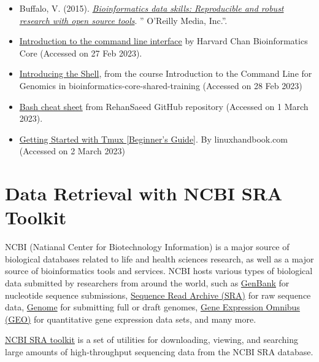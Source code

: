 \documentclass[
  letterpaper,
  DIV=11,
  numbers=noendperiod]{scrreprt}
\begin{document}
\begin{itemize}
\item
  Buffalo, V. (2015).
  \href{https://books.google.co.th/books/about/Bioinformatics_Data_Skills.html?id=XxERCgAAQBAJ}{\emph{Bioinformatics
  data skills: Reproducible and robust research with open source
  tools}}. '' O'Reilly Media, Inc.''.
\item
  \href{https://hbctraining.github.io/Intro-to-shell-flipped/}{Introduction
  to the command line interface} by Harvard Chan Bioinformatics Core
  (Accessed on 27 Feb 2023).
\item
  \href{https://bioinformatics-core-shared-training.github.io/shell-genomics/01-introduction/index.html}{Introducing
  the Shell}, from the course Introduction to the Command Line for
  Genomics in bioinformatics-core-shared-training (Accessed on 28 Feb
  2023)
\item
  \href{https://github.com/RehanSaeed/Bash-Cheat-Sheet}{Bash cheat
  sheet} from RehanSaeed GitHub repository (Accessed on 1 March 2023).
\item
  \href{https://linuxhandbook.com/tmux/}{Getting Started with Tmux
  {[}Beginner's Guide{]}}. By linuxhandbook.com (Accessed on 2 March
  2023)
\end{itemize}


\hypertarget{data-retrieval-with-ncbi-sra-toolkit}{%
\chapter{Data Retrieval with NCBI SRA
Toolkit}\label{data-retrieval-with-ncbi-sra-toolkit}}

NCBI (Natianal Center for Biotechnology Information) is a major source
of biological databases related to life and health sciences research, as
well as a major source of bioinformatics tools and services. NCBI hosts
various types of biological data submitted by researchers from around
the world, such as \href{https://www.ncbi.nlm.nih.gov/nuccore}{GenBank}
for nucleotide sequence submissions,
\href{https://www.ncbi.nlm.nih.gov/sra/}{Sequence Read Archive (SRA)}
for raw sequence data,
\href{https://www.ncbi.nlm.nih.gov/genome/}{Genome} for submitting full
or draft genomes, \href{https://www.ncbi.nlm.nih.gov/gds}{Gene
Expression Omnibus (GEO)} for quantitative gene expression data sets,
and many more.

\href{https://github.com/ncbi/sra-tools}{NCBI SRA toolkit} is a set of
utilities for downloading, viewing, and searching large amounts of
high-throughput sequencing data from the NCBI SRA database.
\end{document}
